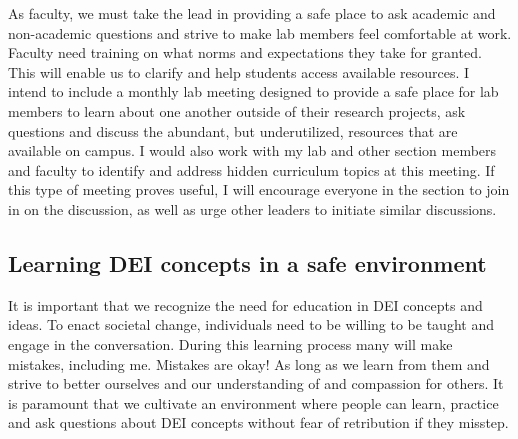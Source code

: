 \documentclass[11pt]{article}
\begin{document}
As faculty, we must take the lead in providing a safe place to ask academic and non-academic questions and strive to make lab members feel comfortable at work. Faculty need training on what norms and expectations they take for granted. This will enable us to clarify and help students access available resources. I intend to include a monthly lab meeting designed to provide a safe place for lab members to learn about one another outside of their research projects, ask questions and discuss the abundant, but underutilized, resources that are available on campus. I would also work with my lab and other section members and faculty to identify and address hidden curriculum topics at this meeting. If this type of meeting proves useful, I will encourage everyone in the section to join in on the discussion, as well as urge other leaders to initiate similar discussions. %













\subsection*{Learning DEI concepts in a safe environment}

It is important that we recognize the need for education in DEI concepts and ideas. To enact societal change, individuals need to be willing to be taught and engage in the conversation. During this learning process many will make mistakes, including me. Mistakes are okay! As long as we learn from them and strive to better ourselves and our understanding of and compassion for others. It is paramount that we cultivate an environment where people can learn, practice and ask questions about DEI concepts without fear of retribution if they misstep. 
\end{document}
